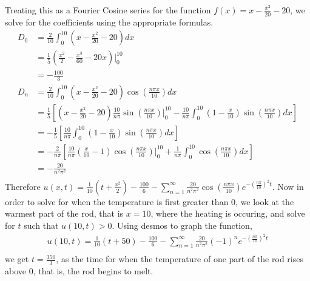 \documentclass[a4paper]{article}
\newcommand{\ds}{\displaystyle}
\begin{document}
\begin{enumerate}
\begin{enumerate}
		Treating this as a Fourier Cosine series for the function $\ds{f(x) = x - \frac{x^2}{20} - 20}$, we solve for the coefficients using the appropriate formulas.
		\begin{align*}
			D_0 & = \frac{2}{10}\int^{10}_0\left(x - \frac{x^2}{20} - 20\right)dx\\
			& = \frac{1}{5}\left(\frac{x^2}{2} - \frac{x^3}{60} - 20x\right)\Bigg|^{10}_0\\
			& = -\frac{100}{3}\\
			D_n & = \frac{2}{10}\int^{10}_0\left(x - \frac{x^2}{20} - 20\right)\cos\left(\frac{n\pi x}{10}\right)dx\\
			& = \frac{1}{5}\left[\left(x - \frac{x^2}{20} - 20\right)\frac{10}{n\pi}\sin\left(\frac{n\pi x}{10}\right) \Bigg|^{10}_0 - \frac{10}{n\pi}\int^{10}_0\left(1 - \frac{x}{10}\right)\sin\left(\frac{n\pi x}{10}\right)dx \right]\\
			& = -\frac{1}{5}\left[\frac{10}{n\pi}\int^{10}_0\left(1 - \frac{x}{10}\right)\sin\left(\frac{n\pi x}{10}\right)dx \right]\\
			& = -\frac{2}{n\pi}\left[\frac{10}{n\pi}\left(\frac{x}{10} - 1\right)\cos\left(\frac{n\pi x}{10}\right) \Bigg|^{10}_{0} + \frac{1}{n\pi}\int^{10}_0\cos\left(\frac{n\pi x}{10}\right)dx \right]\\
			& = -\frac{20}{n^2\pi^2}\\
		\end{align*}
		Therefore $\ds{u(x,t) = \frac{1}{10}\left(t+\frac{x^2}{2}\right) - \frac{100}{6} - \sum^{\infty}_{n=1}\frac{20}{n^2\pi^2}\cos\left(\frac{n\pi x}{10}\right)e^{-\left(\frac{n\pi}{10}\right)^2 t}}$.
		\bigbreak
		Now in order to solve for when the temperature is first greater than 0, we look at the warmest part of the rod, that is $\ds{x=10}$, where the heating is occuring, and solve for $\ds{t}$ such that $\ds{u(10,t) > 0}$. Using desmos to graph the function,
		\begin{align*}
		u(10,t) = \frac{1}{10}\left(t + 50\right) - \frac{100}{6} - \sum^{\infty}_{n=1}\frac{20}{n^2\pi^2}(-1)^ne^{-\left(\frac{n\pi}{10}\right)^2 t}\\
		\end{align*}
		we get $\ds{t = \frac{350}{3}}$, as the time for when the temperature of one part of the rod rises above 0, that is, the rod begins to melt.

	\end{enumerate}

\end{enumerate}
\end{document}
